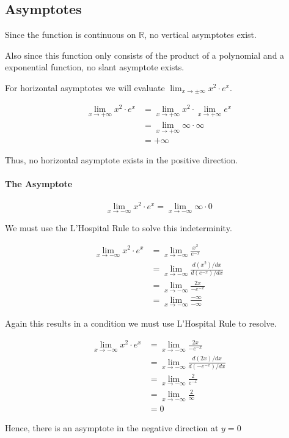 \subsection{Asymptotes}

Since the function is continuous on \(\mathbb{R}\), no vertical asymptotes
exist.

Also since this function only consists of the product of a polynomial 
and a exponential function, no slant asymptote exists.

For horizontal asymptotes we will evaluate 
\(\lim_{x \rightarrow \pm\infty} {x^2\cdot e^x}\).

\[
    \begin{aligned}
        \lim_{x\rightarrow +\infty} {x^2 \cdot e^x} &
        = \lim_{x\rightarrow +\infty} {x^2} \cdot 
          \lim_{x\rightarrow +\infty} {e^x} \\
        & = \lim_{x\rightarrow +\infty} \infty \cdot \infty \\
        & = +\infty
    \end{aligned}
\]

Thus, no horizontal asymptote exists in the positive direction.

\paragraph{The Asymptote}
\[
    \lim_{x\rightarrow -\infty} {x^2 \cdot e^x}
    = \lim_{x\rightarrow -\infty} {\infty\cdot 0}
\]

We must use the L'Hospital Rule to solve this indeterminity.

\[
    \begin{aligned}
        \lim_{x\rightarrow -\infty} {x^2 \cdot e^x} &
        = \lim_{x\rightarrow -\infty} \frac{x^2}{e^{-x}} \\
        & = \lim_{x\rightarrow -\infty} 
                \frac{ {d(x^2)} / {dx}}
                     { {d(e^{-x})} / {dx}} \\
        & = \lim_{x\rightarrow -\infty}
                \frac{ 2x }
                     { -e^{-x} } \\
        & = \lim_{x\rightarrow -\infty}
                \frac{-\infty}{-\infty}
    \end{aligned}
\]

Again this results in a condition we must use L'Hospital Rule to resolve.

\[
    \begin{aligned}
        \lim_{x\rightarrow -\infty} {x^2 \cdot e^x} &
        = \lim_{x\rightarrow -\infty}
                \frac{ 2x }
                     { -e^{-x} } \\
        & = \lim_{x\rightarrow -\infty}
                 \frac{d(2x)/dx}
                      {d(-e^{-x})/dx} \\
        & = \lim_{x\rightarrow -\infty}
                 \frac{2}
                      {e^{-x}} \\
        & = \lim_{x\rightarrow -\infty}
                \frac{2}
                     {\infty} \\
        & = 0
    \end{aligned}
\]

Hence, there is an asymptote in the negative direction at \(y = 0\)